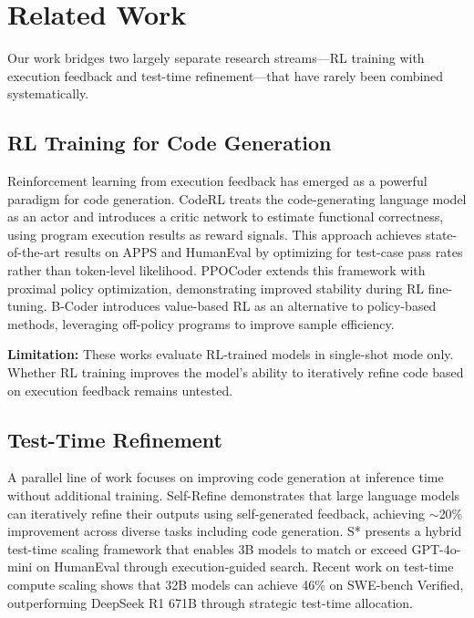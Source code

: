 \section{Related Work}
\label{sec:related}

Our work bridges two largely separate research streams---RL training with execution feedback and test-time refinement---that have rarely been combined systematically.

\subsection{RL Training for Code Generation}

Reinforcement learning from execution feedback has emerged as a powerful paradigm for code generation. CodeRL \citep{le2022coderl} treats the code-generating language model as an actor and introduces a critic network to estimate functional correctness, using program execution results as reward signals. This approach achieves state-of-the-art results on APPS and HumanEval by optimizing for test-case pass rates rather than token-level likelihood. PPOCoder \citep{shojaee2023ppocoder} extends this framework with proximal policy optimization, demonstrating improved stability during RL fine-tuning. B-Coder \citep{yu2023bcoder} introduces value-based RL as an alternative to policy-based methods, leveraging off-policy programs to improve sample efficiency.

\textbf{Limitation:} These works evaluate RL-trained models in single-shot mode only. Whether RL training improves the model's ability to iteratively refine code based on execution feedback remains untested.

\subsection{Test-Time Refinement}

A parallel line of work focuses on improving code generation at inference time without additional training. Self-Refine \citep{madaan2023selfrefine} demonstrates that large language models can iteratively refine their outputs using self-generated feedback, achieving $\sim$20\% improvement across diverse tasks including code generation. S* \citep{li2025sstar} presents a hybrid test-time scaling framework that enables 3B models to match or exceed GPT-4o-mini on HumanEval through execution-guided search. Recent work on test-time compute scaling \citep{ma2025testtimescaling} shows that 32B models can achieve 46\% on SWE-bench Verified, outperforming DeepSeek R1 671B through strategic test-time allocation.


